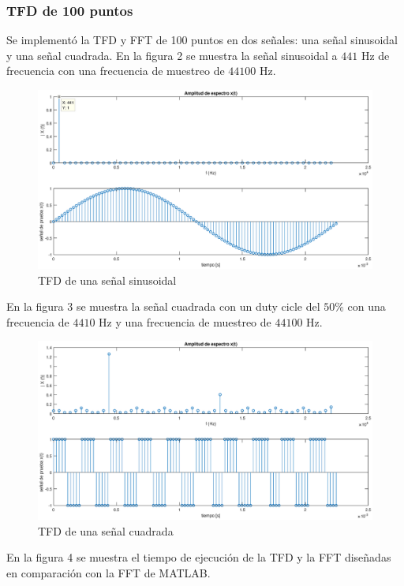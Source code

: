 \documentclass[12pt]{article}
\begin{document}
\subsubsection{TFD de 100 puntos}
Se implementó la TFD y FFT  de 100 puntos en dos señales: una señal sinusoidal y una señal cuadrada. En la figura 2 se muestra la señal sinusoidal a $441$ Hz de frecuencia con una frecuencia de muestreo de $44100$ Hz.
\begin{figure}[h!]
 \centering
 \includegraphics[width=1\textwidth]{ima2.eps}
 \caption{TFD de una señal sinusoidal}
 \label{fig:comparacion}
\end{figure}
En la figura 3 se muestra la señal cuadrada con un duty cicle del $50\%$ con una frecuencia de $4410$ Hz y una frecuencia de muestreo de $44100$ Hz.
\begin{figure}[h!]
 \centering
 \includegraphics[width=1\textwidth]{ima3.eps}
 \caption{TFD de una señal cuadrada}
 \label{fig:comparacion}
\end{figure}
En la figura 4  se muestra el tiempo de ejecución de la TFD y la FFT diseñadas en comparación con la FFT de MATLAB.
\end{document}
